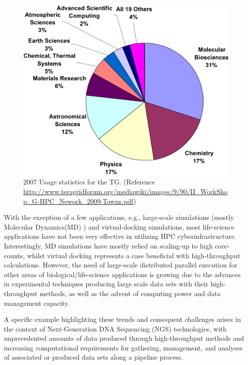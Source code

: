 \documentclass[]{svjour3}
\begin{document}


\begin{figure}
 \centering
\includegraphics[scale=0.40]{figures/teragrid-discipline07}
\caption{\small 2007 Usage statistics for the TG. (Reference
  \url{http://www.teragridforum.org/mediawiki/images/9/90/II_WorkShop_G-HPC_Nework_2009-Towns.pdf})}
  \label{tg2007}
\end{figure}

With the exception of a few applications, e.g., large-scale
simulations (mostly Molecular Dynamics(MD) ) and virtual-docking
simulations, most life-science applications have not been very
effective in utilizing HPC cyberinfrastructure. Interestingly, MD
simulations have mostly relied on scaling-up to high core-counts,
whilst virtual docking represents a case beneficial with high-throughput calculations. However,
the need of large-scale distributed parallel execution for other
areas of biological/life-science applications is growing due to the
advances in experimental techniques producing large scale data sets with their high-throughput methods, as well as the advent of computing power and data management capacity. 

A specific example highlighting these trends and consequent challenges
arises in the context of Next-Generation DNA Sequencing (NGS)
technologies, with unprecedented amounts of data produced through
high-throughput methods and increasing computational requirements for gathering, management, and analyses of associated or produced data sets along a pipeline process. 
\end{document}
